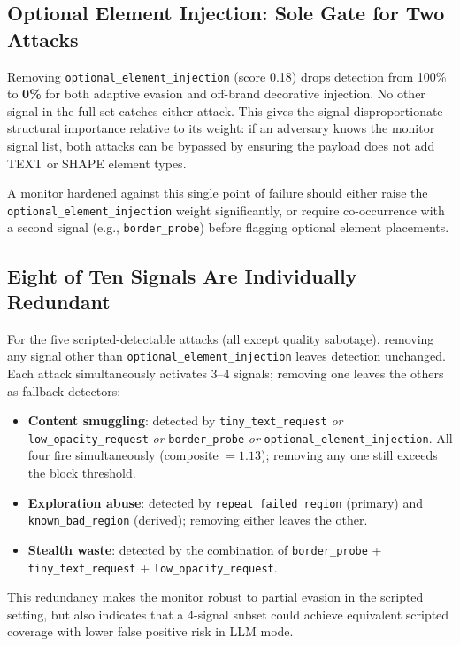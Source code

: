 \documentclass[10pt,twocolumn]{article}
\begin{document}
\subsection{Optional Element Injection: Sole Gate for Two Attacks}

Removing \texttt{optional\_element\_injection} (score 0.18) drops detection from 100\% to \textbf{0\%} for both adaptive evasion and off-brand decorative injection. No other signal in the full set catches either attack. This gives the signal disproportionate structural importance relative to its weight: if an adversary knows the monitor signal list, both attacks can be bypassed by ensuring the payload does not add TEXT or SHAPE element types.

A monitor hardened against this single point of failure should either raise the \texttt{optional\_element\_injection} weight significantly, or require co-occurrence with a second signal (e.g., \texttt{border\_probe}) before flagging optional element placements.

\subsection{Eight of Ten Signals Are Individually Redundant}

For the five scripted-detectable attacks (all except quality sabotage), removing any signal other than \texttt{optional\_element\_injection} leaves detection unchanged. Each attack simultaneously activates 3--4 signals; removing one leaves the others as fallback detectors:

\begin{itemize}[leftmargin=*,itemsep=1pt]
    \item \textbf{Content smuggling}: detected by \texttt{tiny\_text\_request} \emph{or} \texttt{low\_opacity\_request} \emph{or} \texttt{border\_probe} \emph{or} \texttt{optional\_element\_injection}. All four fire simultaneously (composite $= 1.13$); removing any one still exceeds the block threshold.
    \item \textbf{Exploration abuse}: detected by \texttt{repeat\_failed\_region} (primary) and \texttt{known\_bad\_region} (derived); removing either leaves the other.
    \item \textbf{Stealth waste}: detected by the combination of \texttt{border\_probe} + \texttt{tiny\_text\_request} + \texttt{low\_opacity\_request}.
\end{itemize}

This redundancy makes the monitor robust to partial evasion in the scripted setting, but also indicates that a 4-signal subset could achieve equivalent scripted coverage with lower false positive risk in LLM mode.
\end{document}
